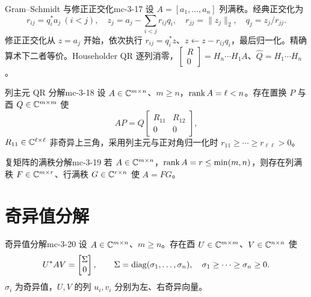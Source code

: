 \begin{proposition}{Gram--Schmidt 与修正正交化}{mc-3-17}
设 $A=[a_1,\ldots,a_n]$ 列满秩。经典正交化为
\[r_{ij}=q_i^*a_j\ (i<j),\quad z_j=a_j-\sum_{i<j}r_{ij}q_i,\quad r_{jj}=\|z_j\|_2,\quad q_j=z_j/r_{jj}.\]
修正正交化从 $z=a_j$ 开始，依次执行 $r_{ij}=q_i^*z$、$z\leftarrow z-r_{ij}q_i$，最后归一化。精确算术下二者等价。Householder QR 逐列消零，$\begin{bmatrix}R\\0\end{bmatrix}=H_n\cdots H_1A$、$\widehat Q=H_1\cdots H_n$。
\end{proposition}

\begin{theorem}{列主元 QR 分解}{mc-3-18}
设 $A\in\mathbb{C}^{m\times n}$、$m\geq n$，$\operatorname{rank} A=\ell<n$。存在置换 $P$ 与酉 $Q\in\mathbb{C}^{m\times m}$ 使
\[AP=Q\begin{bmatrix}R_{11}&R_{12}\\0&0\end{bmatrix},\]
$R_{11}\in\mathbb{C}^{\ell\times\ell}$ 非奇异上三角，采用列主元与正对角归一化时 $r_{11}\geq\cdots\geq r_{\ell\ell}>0$。
\end{theorem}

\begin{corollary}{复矩阵的满秩分解}{mc-3-19}
若 $A\in\mathbb{C}^{m\times n}$，$\operatorname{rank} A=r\leq\min(m,n)$，则存在列满秩 $F\in\mathbb{C}^{m\times r}$、行满秩 $G\in\mathbb{C}^{r\times n}$ 使 $A=FG$。
\end{corollary}

\section{奇异值分解}

\begin{theorem}{奇异值分解}{mc-3-20}
设 $A\in\mathbb{C}^{m\times n}$、$m\geq n$。存在酉 $U\in\mathbb{C}^{m\times m}$、$V\in\mathbb{C}^{n\times n}$ 使
\[U^*AV=\begin{bmatrix}\Sigma\\0\end{bmatrix},\qquad\Sigma=\operatorname{diag}(\sigma_1,\ldots,\sigma_n),\quad\sigma_1\geq\cdots\geq\sigma_n\geq0.\]
$\sigma_i$ 为奇异值，$U,V$ 的列 $u_i,v_i$ 分别为左、右奇异向量。
\end{theorem}

